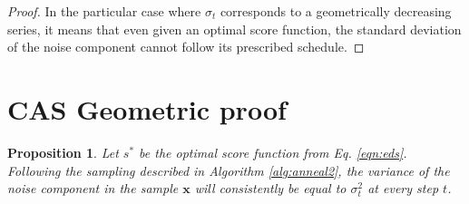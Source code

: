 \documentclass{article} \usepackage{iclr2021_conference_notitle,times}
\theoremstyle{definition}
\theoremstyle{definition}
\newtheorem{proposition}{Proposition}
\begin{document}
\begin{proof}
In the particular case where $\sigma_t$ corresponds to a geometrically decreasing series, it means that even given an optimal score function, the standard deviation of the noise component cannot follow its prescribed schedule.

\end{proof}



 
\section{CAS Geometric proof}\label{app:cas_good_proof}

\begin{proposition}
\em Let $s^*$ be the optimal score function from Eq. \ref{eqn:eds}. Following the sampling described in Algorithm \ref{alg:anneal2}, the variance of the noise component in the sample $\boldsymbol{x}$ will consistently be equal to $\sigma_t^2$ at every step $t$. \em 
\end{proposition}
\end{document}

